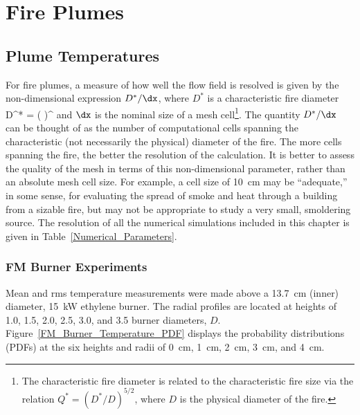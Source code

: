 
\chapter{Fire Plumes}

\section{Plume Temperatures}

For fire plumes, a measure of how well the flow field is resolved is given by the non-dimensional expression $D^*/\dx$, where $D^*$ is a characteristic
fire diameter
\be
   D^* = \left(
     \right)^
\ee
and $\dx$ is the nominal size of a mesh cell\footnote{The characteristic fire diameter is related to the characteristic fire size via the relation $Q^* = (D^*/D)^{5/2}$, where $D$ is the physical diameter of the fire.}. The quantity $D^*/\dx$ can be thought of as the number of computational cells spanning the characteristic (not necessarily the physical) diameter of the fire. The more cells spanning the fire, the better the resolution of the calculation. It is better to assess the quality of the mesh in terms of this non-dimensional parameter, rather than an absolute mesh cell size. For example, a cell size of 10~cm may be ``adequate,'' in some sense, for evaluating the spread of smoke and heat through a building from a sizable fire, but may not be appropriate to study a very small, smoldering source. The resolution of all the numerical simulations included in this chapter is given in Table~\ref{Numerical_Parameters}.

\clearpage

\subsection{FM Burner Experiments}
\label{FM_Burner_Plume}

Mean and rms temperature measurements were made above a 13.7~cm (inner) diameter, 15~kW ethylene burner. The radial profiles are located at heights of 1.0, 1.5, 2.0, 2.5, 3.0, and 3.5 burner diameters, $D$. Figure~\ref{FM_Burner_Temperature_PDF} displays the probability distributions (PDFs) at the six heights and radii of 0~cm, 1~cm, 2~cm, 3~cm, and 4~cm.

